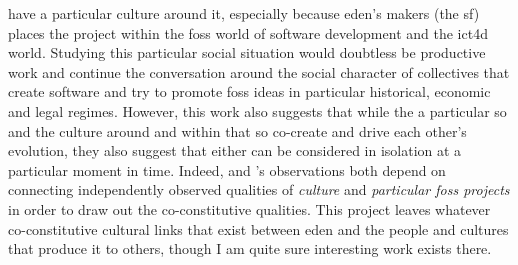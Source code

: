 \documentclass[a4paper,man,natbib]{apa6}
\begin{document}
have a particular culture around it, especially because \acrshort{eden}'s makers (the \gls{sf}) places the project within the \acrshort{foss} world of software development and the \acrfull{ict4d} world. Studying this particular social situation would doubtless be productive work and continue the conversation around the social character of collectives that create software and try to promote \acrshort{foss} ideas in particular historical, economic and legal regimes. However, this work also suggests that while the a particular \gls{so} and the culture around and within that \gls{so} co-create and drive each other's evolution, they also suggest that either can be considered in isolation at a particular moment in time. Indeed, \citet{Kelty2008-jm} and \citet{Gabriella_Coleman2012-lq}'s observations both depend on connecting independently observed qualities of \textit{culture} and \textit{particular \acrshort{foss} projects} in order to draw out the co-constitutive qualities. This project leaves whatever co-constitutive cultural links that exist between \acrshort{eden} and the people and cultures that produce it to others, though I am quite sure interesting work exists there.

\end{document}
